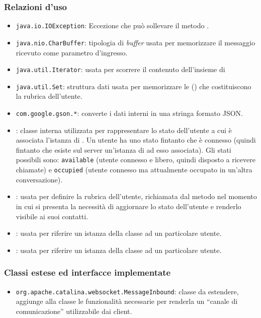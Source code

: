 \subsubsection*{Relazioni d'uso}
\begin{itemize}
	\item \texttt{java.io.IOException}: Eccezione che può sollevare il metodo .
	\item \texttt{java.nio.CharBuffer}: tipologia di \textit{buffer} usata per memorizzare il messaggio ricevuto come parametro d'ingresso.
	\item \texttt{java.util.Iterator}: usata per scorrere il contenuto dell'insieme di 
	\item \texttt{java.util.Set}: struttura dati usata per memorizzare le  () che costituiscono la rubrica dell'utente.
	\item \texttt{com.google.gson.*}: converte i dati interni in una stringa formato JSON.
	\item {}: classe interna utilizzata per rappresentare lo stato dell'utente a cui è associata l'istanza di . Un utente ha uno stato fintanto che è connesso (quindi fintanto che esiste sul server un'istanza di   ad esso associata). Gli stati possibili sono: \texttt{available} (utente connesso e libero, quindi disposto a ricevere chiamate) e \texttt{occupied} (utente connesso ma attualmente occupato in un'altra conversazione).
	\item {}: usata per definire la rubrica dell'utente, richiamata dal metodo  nel momento in cui si presenta la necessità di aggiornare lo stato dell'utente e renderlo visibile ai suoi contatti.
	\item {}: usata per riferire un istanza della classe ad un particolare utente.
	\item {}: usata per riferire un istanza della classe ad un particolare utente.

\end{itemize}

\subsubsection*{Classi estese ed interfacce implementate}
\begin{itemize}
	\item \texttt{org.apache.catalina.websocket.MessageInbound}: classe da estendere, aggiunge alla classe  le funzionalità necessarie per renderla un ``canale di comunicazione'' utilizzabile dai client.
\end{itemize}

